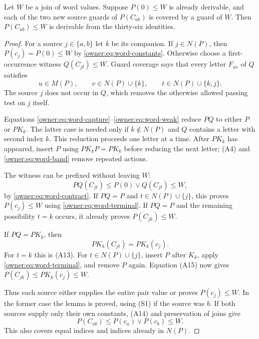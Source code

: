 \begin{lemma}\label{owner:lem:two-source}
Let $W$ be a join of word values. Suppose $P(0)\leq W$ is already
derivable, and each of the two new source guards of $P(C_{ab})$
is covered by a guard of $W$. Then $P(C_{ab})\leq W$ is derivable
from the thirty-six identities.
\end{lemma}
\begin{proof}
For a source $j\in\{a,b\}$ let $k$ be its companion. If
$j\in N(P)$, then $P(c_j)=P(0)\leq W$ by
\eqref{owner:eq:word-constants}. Otherwise choose a first-occurrence
witness $Q(C_{jt})\leq W$. Guard coverage says that every letter
$F_{uv}$ of $Q$ satisfies
\[
 u\in M(P),\qquad v\in N(P)\cup\{k\},
 \qquad t\in N(P)\cup\{k,j\}.
\]
The source $j$ does not occur in $Q$, which removes the otherwise
allowed passing test on $j$ itself.

Equations \eqref{owner:eq:word-capture}--\eqref{owner:eq:word-weak}
reduce $PQ$ to either $P$ or $PK_k$. The latter case is needed
only if $k\notin N(P)$ and $Q$ contains a letter with second
index $k$. This reduction proceeds one letter at a time. After
$PK_k$ has appeared, insert $P$ using $PK_kP=PK_k$ before
reducing the next letter; (A4) and
\eqref{owner:eq:word-band} remove repeated actions.

The witness can be prefixed without leaving $W$:
\[
 P Q(C_{jt})\leq P(0)\vee Q(C_{jt})\leq W,
\]
by \eqref{owner:eq:word-contract}.
If $PQ=P$ and $t\in N(P)\cup\{j\}$, this proves
$P(c_j)\leq W$ using \eqref{owner:eq:word-terminal}.
If $PQ=P$ and the remaining possibility $t=k$ occurs, it
already proves $P(C_{jk})\leq W$.

If $PQ=PK_k$, then
\[
 PK_k(C_{jt})=PK_k(c_j).
\]
For $t=k$ this is (A13). For
$t\in N(P)\cup\{j\}$, insert $P$ after $K_k$, apply
\eqref{owner:eq:word-terminal}, and remove $P$ again.
Equation (A15) now gives
$P(C_{jk})\leq PK_k(c_j)\leq W$.

Thus each source either supplies the entire pair value or proves
$P(c_j)\leq W$. In the former case the lemma is proved, using
(S1) if the source was $b$. If both sources supply only their
own constants, (A14) and preservation of joins give
\[
 P(C_{ab})\leq P(c_a)\vee P(c_b)\leq W.
\]
This also covers equal indices and indices already in $N(P)$.
\end{proof}

